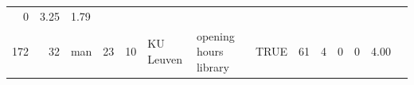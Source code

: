 \documentclass[]{svmono}
\theoremstyle{definition}
\theoremstyle{definition}
\theoremstyle{definition}
\theoremstyle{remark}
\begin{document}
\begin{longtable}[]{@{}rrlrrlllrrrrrr@{}}
\begin{minipage}[t]{0.06\columnwidth}
0\strut
\end{minipage} & \begin{minipage}[t]{0.04\columnwidth}\raggedleft\strut
3.25\strut
\end{minipage} & \begin{minipage}[t]{0.03\columnwidth}\raggedleft\strut
1.79\strut
\end{minipage}\tabularnewline
\begin{minipage}[t]{0.02\columnwidth}\raggedleft\strut
172\strut
\end{minipage} & \begin{minipage}[t]{0.03\columnwidth}\raggedleft\strut
32\strut
\end{minipage} & \begin{minipage}[t]{0.03\columnwidth}\raggedright\strut
man\strut
\end{minipage} & \begin{minipage}[t]{0.02\columnwidth}\raggedleft\strut
23\strut
\end{minipage} & \begin{minipage}[t]{0.03\columnwidth}\raggedleft\strut
10\strut
\end{minipage} & \begin{minipage}[t]{0.09\columnwidth}\raggedright\strut
KU Leuven\strut
\end{minipage} & \begin{minipage}[t]{0.14\columnwidth}\raggedright\strut
opening hours library\strut
\end{minipage} & \begin{minipage}[t]{0.04\columnwidth}\raggedright\strut
TRUE\strut
\end{minipage} & \begin{minipage}[t]{0.02\columnwidth}\raggedleft\strut
61\strut
\end{minipage} & \begin{minipage}[t]{0.03\columnwidth}\raggedleft\strut
4\strut
\end{minipage} & \begin{minipage}[t]{0.05\columnwidth}\raggedleft\strut
0\strut
\end{minipage} & \begin{minipage}[t]{0.06\columnwidth}\raggedleft\strut
0\strut
\end{minipage} & \begin{minipage}[t]{0.04\columnwidth}\raggedleft\strut
4.00\strut
\end{minipage} & \begin{minipage}[t]{0.03\columnwidth}\raggedleft\strut

\end{minipage}
\end{longtable}
\end{document}
